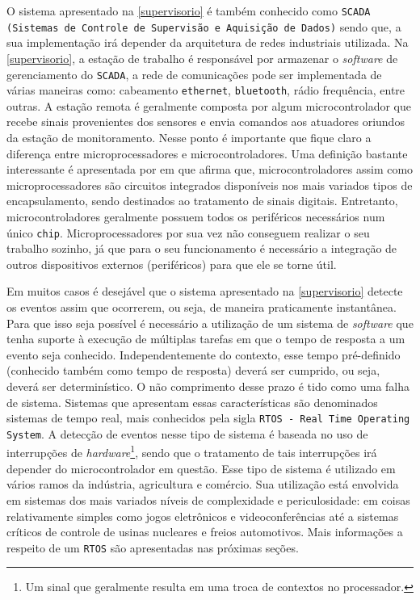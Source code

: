 O sistema apresentado na \autoref{supervisorio} é também conhecido como \texttt{SCADA (Sistemas de Controle de Supervisão e Aquisição de Dados)} 
sendo que, a sua implementação irá depender da arquitetura de redes industriais utilizada. Na \autoref{supervisorio}, a estação de trabalho 
é responsável por armazenar o \textit{software} de gerenciamento do \texttt{SCADA}, a rede de comunicações pode ser implementada de várias maneiras 
como: cabeamento \texttt{ethernet}, \texttt{bluetooth}, rádio frequência, entre outras. A estação remota é geralmente composta por algum microcontrolador 
que recebe sinais provenientes dos sensores e envia comandos aos atuadores oriundos da estação de monitoramento. Nesse ponto é 
importante que fique claro a diferença entre microprocessadores e microcontroladores. Uma definição bastante interessante é apresentada 
por \cite{andrade2006} em que afirma que, microcontroladores assim como microprocessadores são circuitos integrados disponíveis 
nos mais variados tipos de encapsulamento, sendo destinados ao tratamento de sinais digitais. Entretanto, microcontroladores geralmente 
possuem todos os periféricos necessários num único \texttt{chip}. Microprocessadores por sua vez não conseguem realizar o seu trabalho sozinho, 
já que para o seu funcionamento é necessário a integração de outros dispositivos externos (periféricos) para que ele se torne útil.

Em muitos casos é desejável que o sistema apresentado na \autoref{supervisorio} detecte os eventos assim que ocorrerem, ou seja, de maneira praticamente 
instantânea. Para que isso seja possível é necessário a utilização de um sistema de \textit{software} que tenha suporte à execução de múltiplas tarefas 
em que o tempo de resposta a um evento seja conhecido. Independentemente do contexto, esse tempo pré-definido (conhecido também como tempo de 
resposta) deverá ser cumprido, ou seja, deverá ser determinístico. O não comprimento desse prazo é tido como uma falha de sistema. Sistemas que 
apresentam essas características são denominados sistemas de tempo real, mais conhecidos pela sigla \texttt{RTOS - Real Time Operating System}. A detecção 
de eventos nesse tipo de sistema é baseada no uso de interrupções de \textit{hardware}\footnote{Um sinal que geralmente resulta em uma troca de contextos no processador.}, sendo que o tratamento de tais interrupções irá depender do microcontrolador em questão. Esse tipo de sistema é utilizado em vários ramos da indústria, agricultura e comércio. Sua utilização está envolvida em sistemas dos mais variados níveis de complexidade e periculosidade: em coisas relativamente simples como jogos eletrônicos e videoconferências até a sistemas críticos de controle de usinas nucleares e freios automotivos. Mais informações a respeito de um \texttt{RTOS} são apresentadas nas próximas seções.


